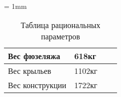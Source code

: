 

\tabulinesep = 1mm
\begin{table}[H]
\captionsetup{justification=centering}
\caption{Таблица рациональных параметров}
\begin{tabu}to 
\hline
Вес фюзеляжа & 618кг & & \\ \hline
Вес крыльев & 1102кг & & \\ \hline
Вес конструкции & 1722кг & & \\ \hline
\end{tabu}
\end{table}
